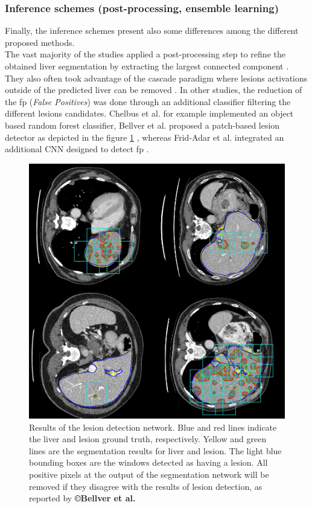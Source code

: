 \subsubsection{Inference schemes (post-processing, ensemble learning)}


Finally, the inference schemes present also some differences among the
different proposed methods. \\
The vast majority of the studies applied a post-processing step to
refine the obtained liver segmentation by extracting the largest
connected component \cite{Li2018, Han2017, Yuan2017, Bellver2017, Kaluva2018}. They
also often took advantage of the cascade paradigm where lesions
activations outside of the predicted liver can be removed \cite{Li2018, Yuan2017, Vorontsov2018}. In other studies, the reduction of the \ac{fp}
(\emph{False Positives}) was done through an additional classifier
filtering the different lesions candidates. Chelbus et al. \cite{Chlebus2018} for
example implemented an object based random forest classifier,
Bellver et al. proposed a patch-based lesion detector as
depicted in the figure \ref{Bellver_predResults} \cite{Bellver2017}, whereas Frid-Adar et al. integrated an
additional CNN designed to detect \ac{fp} \cite{Frid-adar2017}.

\begin{figure}[th!]
	\centering
	\includegraphics[width=0.5\linewidth]{images/Bellver2017_Fig2}
	\caption{Results of the lesion detection network. Blue and red lines indicate the liver and lesion ground truth, respectively. Yellow and green lines are the segmentation results for liver and lesion. The light blue bounding boxes are the windows detected as having a lesion. All positive pixels at the output of the segmentation network will be removed if they disagree with the results of lesion detection, as reported by \textbf{©Bellver et al. \cite{Bellver2017}}}
	\label{Bellver_predResults}
\end{figure}


